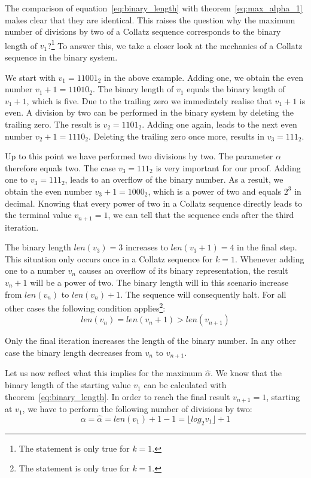 \documentclass{SciPress_2015}
\begin{document}
The comparison of equation~\ref{eq:binary_length} with theorem~\ref{eq:max_alpha_1} makes clear that they are identical. This raises the question why the maximum number of divisions by two of a Collatz sequence corresponds to the binary length of $v_1$?\footnote{The statement is only true for $k=1$.} To answer this, we take a closer look at the mechanics of a Collatz sequence in the binary system.

\par\medskip
We start with $v_1=11001_2$ in the above example. Adding one, we obtain the even number $v_1+1=11010_2$. The binary length of $v_1$ equals the binary length of $v_1+1$, which is five. Due to the trailing zero we immediately realise that $v_1+1$ is even. A division by two can be performed in the binary system by deleting the trailing zero. The result is $v_2=1101_2$. Adding one again, leads to the next even number $v_2+1=1110_2$. Deleting the trailing zero once more, results in $v_3=111_2$.

\par\medskip
Up to this point we have performed two divisions by two. The parameter $\alpha$ therefore equals two. The case $v_3=111_2$ is very important for our proof. Adding one to $v_3=111_2$, leads to an overflow of the binary number. As a result, we obtain the even number $v_3+1=1000_2$, which is a power of two and equals $2^3$ in decimal. Knowing that every power of two in a Collatz sequence directly leads to the terminal value $v_{n+1}=1$, we can tell that the sequence ends after the third iteration.

\par\medskip
The binary length $len(v_3)=3$ increases to $len(v_3+1)=4$ in the final step. This situation only occurs once in a Collatz sequence for $k=1$. Whenever adding one to a number $v_n$ causes an overflow of its binary representation, the result $v_n+1$ will be a power of two. The binary length will in this scenario increase from $len(v_n)$ to $len(v_n)+1$. The sequence will consequently halt. For all other cases the following condition applies\footnote{The statement is only true for $k=1$.}:
\begin{equation}
	len(v_n)=len(v_n+1)>len(v_{n+1})
\end{equation}

Only the final iteration increases the length of the binary number. In any other case the binary length decreases from $v_n$ to $v_{n+1}$.

\par\medskip
Let us now reflect what this implies for the maximum $\hat\alpha$. We know that the binary length of the starting value $v_1$ can be calculated with theorem~\ref{eq:binary_length}. In order to reach the final result $v_{n+1}=1$, starting at $v_1$, we have to perform the following number of divisions by two:
\begin{equation}
	\alpha=\hat\alpha=len(v_1)+1-1=\lfloor log_2 v_1\rfloor+1
\end{equation}
\end{document}
